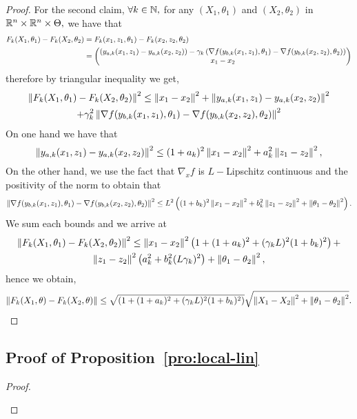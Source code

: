 \begin{appendices}
\begin{proof}
 For the second claim,  $\forall k\in\mathbb{N},$   for any  $(X_1,\theta_1)$ and $(X_2,\theta_2)$ in $\mathbb{R}^n\times\mathbb{R}^n\times\Theta,$ we have that 
 \begin{align*}
 F_k(X_1,\theta_1)-F_k(X_2,\theta_2)&=F_k(x_1,z_1,\theta_1)-F_k(x_2,z_2,\theta_2)\\
 &=\begin{pmatrix}
\left({y_{a,k}(x_1,z_1)-y_{a,k}(x_2,z_2)}\right)-\gamma_{k}\left({\nabla f(y_{b,k}(x_1,z_1),\theta_1)-\nabla f(y_{b,k}(x_2,z_2),\theta_2)}\right)\\
x_1-x_2
\end{pmatrix}
 \end{align*}
therefore by triangular inequality we get,
\begin{multline*}
\left\Vert {F_k(X_1,\theta_1)-F_k(X_2,\theta_2)} \right\Vert^2\leq\left\Vert {x_1-x_2} \right\Vert^2+ \left\Vert {y_{a,k}(x_1,z_1)-y_{a,k}(x_2,z_2)} \right\Vert^2\\+\gamma_{k}^2\left\Vert {\nabla f(y_{b,k}(x_1,z_1),\theta_1)-\nabla f(y_{b,k}(x_2,z_2),\theta_2)} \right\Vert^2
\end{multline*}
On one hand we have  that 
\[
\left\Vert {y_{a,k}(x_1,z_1)-y_{a,k}(x_2,z_2)} \right\Vert^2\leq(1+a_{k})^2\left\Vert {x_1-x_2} \right\Vert^2+a_{k}^2\left\Vert {z_1-z_2} \right\Vert^2,
\]
On the other hand, we use the fact that $\nabla_x f$ is $L-$Lipschitz continuous and the positivity of the norm to obtain that
\[
\left\Vert {\nabla f(y_{b,k}(x_1,z_1),\theta
_1)-\nabla f(y_{b,k}(x_2,z_2),\theta_2)} \right\Vert^2\leq L^2\left({(1+b_{k})^2\left\Vert {x_1-x_2} \right\Vert^2+b_{k}^2\left\Vert {z_1-z_2} \right\Vert^2+\left\Vert {\theta_1-\theta_2} \right\Vert^2}\right). 
\]
We sum each bounds and we arrive at  
\begin{multline*}
\left\Vert {F_k(X_1,\theta_1)-F_k(X_2,\theta_2)} \right\Vert^2\leq \left\Vert {x_1-x_2} \right\Vert^2\left({1+(1+a_{k})^2+(\gamma_{k} L)^2(1+b_{k})^2}\right)+\\\left\Vert {z_1-z_2} \right\Vert^2\left({a_{k}^2
+b_{k}^2(L\gamma_{k})^2}\right)+\left\Vert {\theta_1-\theta_2} \right\Vert^2,
\end{multline*}
hence we obtain,
\begin{equation*}
\left\Vert {F_k(X_1,\theta)-F_k(X_2,\theta)} \right\Vert\leq\sqrt{\left({1+(1+a_{k})^2+(\gamma_{k} L)^2(1+b_{k})^2}\right)}\sqrt{\left\Vert {X_1-X_2} \right\Vert^2+\left\Vert {\theta_1-\theta_2} \right\Vert^2}.
\end{equation*}
\end{proof}

\subsection{Proof  of Proposition~\ref{pro:local-lin}}\label{prf:pro:local-lin}
\begin{proof}$~$
\begin{itemize}


\end{itemize}
\end{proof}
\end{appendices}
